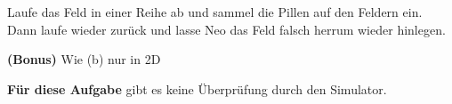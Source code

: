             \subexcercise Laufe das Feld in einer Reihe ab und sammel die Pillen auf den Feldern ein. Dann laufe wieder zurück und lasse Neo das Feld falsch herrum wieder hinlegen.

                \subexcercise \textbf{(Bonus)} Wie (b) nur in 2D

                \textbf{Für diese Aufgabe} gibt es keine Überprüfung durch den Simulator.
